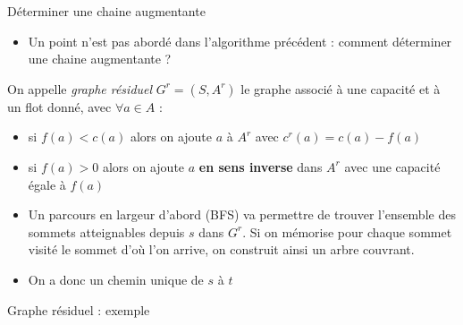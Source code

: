 \begin{frame}{Déterminer une chaine augmentante}
    \begin{itemize}
        \item Un point n'est pas abordé dans l'algorithme précédent : comment déterminer une chaine augmentante ?
    \end{itemize}
    \begin{definition}
        On appelle \emph{graphe résiduel} $G^r=(S,A^r)$ le graphe associé à une capacité et à un flot donné, avec $\forall a \in A$ :
        \begin{itemize}
            \item si $f(a) < c(a)$ alors on ajoute $a$ à $A^r$ avec $c^r(a) = c(a)-f(a)$
            \item si $f(a) > 0$ alors on ajoute $a$ \textbf{en sens inverse} dans $A^r$ avec une capacité égale à $f(a)$
        \end{itemize}
    \end{definition}
    \begin{itemize}
    \item Un parcours en largeur d'abord (BFS) va permettre de trouver l'ensemble des sommets atteignables depuis $s$ dans $G^r$. Si on mémorise pour chaque sommet visité le sommet d'où l'on arrive, on construit ainsi un arbre couvrant. 
    \item On a donc un chemin unique de $s$ à $t$ 
\end{itemize}
\end{frame}


\begin{frame}{Graphe résiduel : exemple}
\begin{center}
    \scalebox{0.65}{} 
    \scalebox{0.65}{}
\end{center}
\end{frame} 



